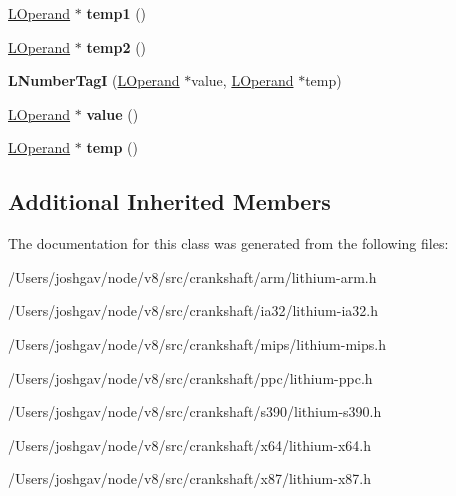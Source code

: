 \begin{DoxyCompactItemize}
\item 
\hyperlink{classv8_1_1internal_1_1_l_operand}{L\+Operand} $\ast$ {\bfseries temp1} ()\hypertarget{classv8_1_1internal_1_1_l_number_tag_i_a2fecebdcf5d9ce508e3fd3f24ee82850}{}\label{classv8_1_1internal_1_1_l_number_tag_i_a2fecebdcf5d9ce508e3fd3f24ee82850}

\item 
\hyperlink{classv8_1_1internal_1_1_l_operand}{L\+Operand} $\ast$ {\bfseries temp2} ()\hypertarget{classv8_1_1internal_1_1_l_number_tag_i_aaa03e3b699a9c03b971db41b85de0351}{}\label{classv8_1_1internal_1_1_l_number_tag_i_aaa03e3b699a9c03b971db41b85de0351}

\item 
{\bfseries L\+Number\+TagI} (\hyperlink{classv8_1_1internal_1_1_l_operand}{L\+Operand} $\ast$value, \hyperlink{classv8_1_1internal_1_1_l_operand}{L\+Operand} $\ast$temp)\hypertarget{classv8_1_1internal_1_1_l_number_tag_i_a453b9ce63c6b1642fbb8f451a8c78c76}{}\label{classv8_1_1internal_1_1_l_number_tag_i_a453b9ce63c6b1642fbb8f451a8c78c76}

\item 
\hyperlink{classv8_1_1internal_1_1_l_operand}{L\+Operand} $\ast$ {\bfseries value} ()\hypertarget{classv8_1_1internal_1_1_l_number_tag_i_af1937f50e27c8665954070a538f640e4}{}\label{classv8_1_1internal_1_1_l_number_tag_i_af1937f50e27c8665954070a538f640e4}

\item 
\hyperlink{classv8_1_1internal_1_1_l_operand}{L\+Operand} $\ast$ {\bfseries temp} ()\hypertarget{classv8_1_1internal_1_1_l_number_tag_i_aae73b5a6e9e61e27a58995ce48f6ddcc}{}\label{classv8_1_1internal_1_1_l_number_tag_i_aae73b5a6e9e61e27a58995ce48f6ddcc}

\end{DoxyCompactItemize}
\subsection*{Additional Inherited Members}


The documentation for this class was generated from the following files\+:\begin{DoxyCompactItemize}
\item 
/\+Users/joshgav/node/v8/src/crankshaft/arm/lithium-\/arm.\+h\item 
/\+Users/joshgav/node/v8/src/crankshaft/ia32/lithium-\/ia32.\+h\item 
/\+Users/joshgav/node/v8/src/crankshaft/mips/lithium-\/mips.\+h\item 
/\+Users/joshgav/node/v8/src/crankshaft/ppc/lithium-\/ppc.\+h\item 
/\+Users/joshgav/node/v8/src/crankshaft/s390/lithium-\/s390.\+h\item 
/\+Users/joshgav/node/v8/src/crankshaft/x64/lithium-\/x64.\+h\item 
/\+Users/joshgav/node/v8/src/crankshaft/x87/lithium-\/x87.\+h\end{DoxyCompactItemize}
